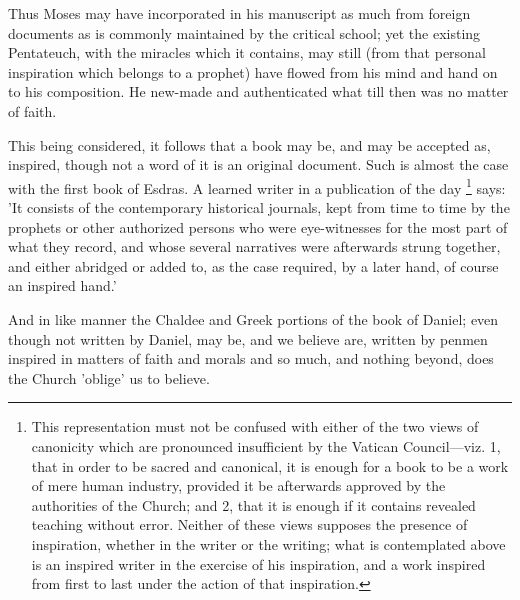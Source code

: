 Thus Moses may have incorporated in his
manuscript as much from foreign documents as is commonly maintained by
the critical school; yet the existing Pentateuch, with the miracles
which it contains, may still (from that personal inspiration which
belongs to a prophet) have flowed from his mind and hand on to his
composition. He new-made and authenticated what till then was no
matter of faith.

This being considered, it follows that a book may
be, and may be accepted as, inspired, though not a word of it is an
original document. Such is almost the case with the first book of
Esdras. A learned writer in a publication of the day \footnote{This representation must not be confused with either of the two views
of canonicity which are pronounced insufficient by the Vatican
Council—viz. 1, that in order to be sacred and canonical, it is
enough for a book to be a work of mere human industry, provided it be
afterwards approved by the authorities of the Church; and 2, that it
is enough if it contains revealed teaching without error. Neither of
these views supposes the presence of inspiration, whether in the
writer or the writing; what is contemplated above is an inspired
writer in the exercise of his inspiration, and a work inspired from
first to last under the action of that inspiration.} says: 'It consists of the contemporary historical journals,
kept from time to time by the prophets or other authorized persons who
were eye-witnesses for the most part of what they record, and whose
several narratives were afterwards strung together, and either
abridged or added to, as the case required, by a later hand, of course
an inspired hand.'

And in like manner the Chaldee and Greek portions
of the book of Daniel; even though not written by Daniel, may be, and
we believe are, written by penmen inspired in matters of faith and
morals and so much, and nothing beyond, does the Church 'oblige' us to
believe.

